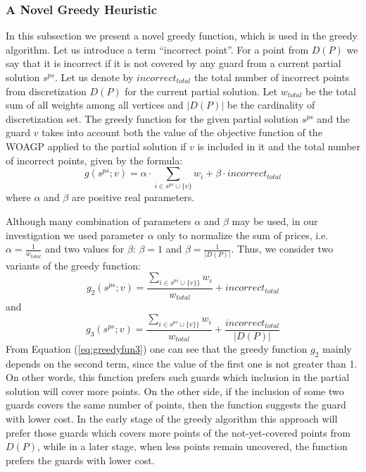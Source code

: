 \documentclass[runningheads,a4paper]{elsarticle}
\begin{document}
	\subsubsection{A Novel Greedy Heuristic}
	In this subsection we present a novel greedy function, which is used in the greedy algorithm. Let us introduce a term  ``incorrect point''. For a point from $D(P)$ we say that it is incorrect if it is not covered by any guard from a current partial solution $s^{ps}$. Let us denote by $incorrect_{total}$ the total number of incorrect points from discretization $D(P)$ for the current partial solution.  Let $w_{total}$ be the total sum of all weights among all vertices and $|D(P)|$ be the cardinality of discretization set. The greedy function for the given partial solution $s^{ps}$ and the guard $v$ takes into account both the value of the objective function of the WOAGP  applied to the partial solution if $v$ is included in it and the total number of incorrect points, given by the formula:
	\begin{equation}\label{eq:greedyfun2}
	g(s^{ps}; v) = \alpha \cdot \sum_{i \in s^{ps} \cup \{v\}} w_i+ \beta \cdot {incorrect_{total}}
	\end{equation}
	where $\alpha$ and $\beta$ are positive real parameters.
	
	Although many combination of parameters $ \alpha $ and $\beta$ may be used, in our investigation we used parameter $\alpha$  only to normalize the sum of prices, i.e. $\alpha = \frac{1}{w_{total}}$ and two values for $\beta$: $\beta = 1$ and $\beta = \frac{1}{|D(P)|}$. Thus, we consider two variants of the greedy function:
	\begin{equation}\label{eq:greedyfun3}
	g_2(s^{ps}; v)  =  \frac{\sum_{i \in s^{ps} \cup \{v\}\}} w_i}{w_{total}}+ incorrect_{total}
	\end{equation}
	and
	\begin{equation}\label{eq:greedyfun4}
	g_3(s^{ps}; v)  =    \frac{\sum_{i \in s^{ps} \cup \{v\}\}} w_i}{w_{total}}+ \frac{incorrect_{total}}{|D(P)|}
	\end{equation}
	From Equation (\ref{eq:greedyfun3}) one can see that the greedy function $g_2$ mainly depends on the second term, since the value of the first one is not greater than 1. On other words, this function prefers such guards  which inclusion in the partial solution will cover more points. On the other side, if the inclusion of some two guards covers the same number of points, then the function suggests  the guard with lower cost. In the early stage of the greedy algorithm this approach will prefer those guards which covers more points of the not-yet-covered points from $D(P)$, while in a later stage, when less points remain uncovered, the function prefers the guards with lower cost.
	
\end{document}

